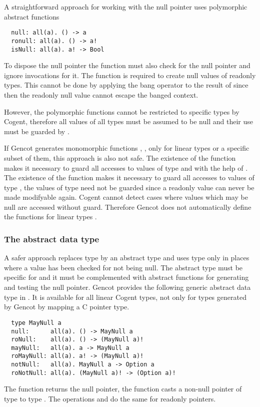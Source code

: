 A straightforward approach for working with the null pointer uses polymorphic abstract functions
\begin{verbatim}
  null: all(a). () -> a
  ronull: all(a). () -> a!
  isNull: all(a). a! -> Bool
\end{verbatim}
To dispose the null pointer the function  must also check for the null pointer and ignore
invocations for it. The function  is required to create null values of readonly types. This cannot be done 
by applying the bang operator to the result of  since then the readonly null value
cannot escape the banged context. 

However, the polymorphic functions cannot be restricted to specific types  by Cogent, therefore all values of all
types must be assumed to be null and their use must be guarded by .

If Gencot generates monomorphic functions , ,  only for linear types or a
specific subset of them, this approach is also not safe. The existence of the function  makes it necessary to guard all accesses to values of type
 and  with the help of . The existence of the function  makes it necessary to guard
all accesses to values of type , the values of type  need not be guarded since a readonly value can never be 
made modifyable again. Cogent cannot detect cases where values which may be null are accessed without guard.
Therefore Gencot does not automatically define the functions for linear types .

\subsubsection{The abstract data type }

A safer approach replaces type  by an abstract type and uses type  only in places where a value has been checked
for not being null. The abstract type must be specific for  and it must be complemented with abstract functions for
generating and testing the null pointer. Gencot provides the following generic abstract data type in .
It is available for all linear Cogent types, not only for types generated by Gencot by mapping a C pointer type.
\begin{verbatim}
  type MayNull a 
  null:      all(a). () -> MayNull a
  roNull:    all(a). () -> (MayNull a)!
  mayNull:   all(a). a -> MayNull a
  roMayNull: all(a). a! -> (MayNull a)!
  notNull:   all(a). MayNull a -> Option a
  roNotNull: all(a). (MayNull a)! -> (Option a)!
\end{verbatim}
The function  returns the null pointer, the function  casts a non-null pointer of type 
to type . The operations  and  do the same for readonly pointers. 

